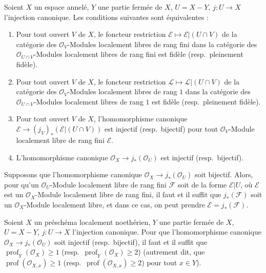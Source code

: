 \begin{corollary}[21.13.3]
\label{IV.21.13.3}
Soient $X$ un espace annelé, $Y$ une partie fermée de $X$, $U=X-Y$,
$j:U\to X$ l'injection canonique. Les conditions suivantes sont équivalentes :
\begin{enumerate}[label=\emph{\alph*)}]
  \item Pour tout ouvert $V$ de $X$, le foncteur restriction
  $\mathscr E\mapsto\mathscr E|(U\cap V)$ de la catégorie des
  $\mathcal O_V$-Modules localement libres de rang fini dans la catégorie des
  $\mathcal O_{U\cap V}$-Modules localement libres de rang fini est fidèle
  (resp.\ pleinement fidèle).
  \item[\emph{a')}] Pour tout ouvert $V$ de $X$, le foncteur restriction
  $\mathscr L\mapsto\mathscr L|(U\cap V)$ de la catégorie des
  $\mathcal O_V$-Modules localement libres de rang $1$ dans la catégorie des
  $\mathcal O_{U\cap V}$-Modules localement libres de rang $1$ est fidèle
  (resp.\ pleinement fidèle).
  \item Pour tout ouvert $V$ de $X$, l'homomorphisme canonique
  $\mathscr E\to(j_V)_*(\mathscr E|(U\cap V))$ est injectif (resp.\ bijectif) pour
  tout $\mathcal O_V$-Module localement libre de rang fini $\mathscr E$.
  \item[\emph{b')}] L'homomorphisme canonique
  $\mathcal O_X\to j_*(\mathcal O_U)$ est injectif (resp.\ bijectif).
\end{enumerate}

Supposons que l'homomorphisme canonique $\mathcal O_X\to j_*(\mathcal O_U)$ soit
bijectif. Alors, pour qu'un $\mathcal O_U$-Module localement libre de rang fini
$\mathscr F$ soit de la forme $\mathscr E|U$, où $\mathscr E$ est un
$\mathcal O_X$-Module localement libre de rang fini, il faut et il suffit que
$j_*(\mathscr F)$ soit un $\mathcal O_X$-Module localement libre, et dans ce cas, on
peut prendre $\mathscr E=j_*(\mathscr F)$.
\end{corollary}

\begin{lemma}[21.13.4]
\label{IV.21.13.4}
Soient $X$ un préschéma localement noethérien, $Y$ une partie fermée de $X$,
$U=X-Y$, $j:U\to X$ l'injection canonique. Pour que l'homomorphisme canonique
$\mathcal O_X\to j_*(\mathcal O_U)$ soit injectif (resp.\ bijectif), il faut et il
suffit que $\operatorname{prof}_Y(\mathcal O_X)\geq1$
(resp.\ $\operatorname{prof}_Y(\mathcal O_X)\geq2$) (autrement dit, que
$\operatorname{prof}(\mathcal O_{X,x})\geq1$
(resp.\ $\operatorname{prof}(\mathcal O_{X,x})\geq2$) pour tout $x\in Y$).
\end{lemma}

